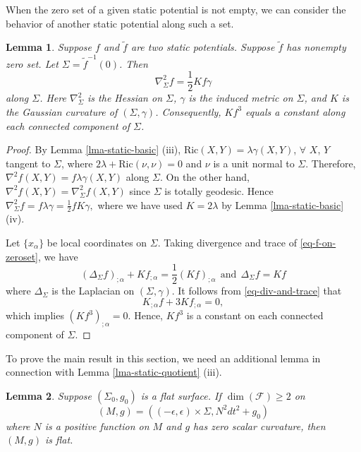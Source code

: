 \documentclass[12pt]{amsart}
\newtheorem{lma}{Lemma}[section]
\theoremstyle{remark}
\numberwithin{equation}{section}
\newcommand{\Ric}{\mbox{Ric}}
\newcommand{\be}{\begin{equation}}
\newcommand{\ee}{\end{equation}}
\newcommand{\bee}{\begin{equation*}}
\newcommand{\eee}{\end{equation*}}
\def\tf{\tilde{f}}
\def\K{\mathcal{F}}
\def\l{\lambda}
\def\tf{\tilde{f}}
\begin{document}
When the zero set of a given static potential is not empty, we can
 consider the behavior of another static potential along such a set.


\begin{lma} \label{lma-eq-on-zero}
Suppose $ f $ and $  \tf $ are two static potentials.
Suppose $\tf $ has nonempty zero set.
Let $ \Sigma = \tf^{-1}(0)$.
Then
\be \label{eq-f-on-zeroset}
 \nabla^2_\Sigma f  = \frac12 K f  \gamma
 \ee
along $ \Sigma$.  Here $ \nabla^2_\Sigma $ is the Hessian on $\Sigma$, $ \gamma $ is the induced metric on $ \Sigma$, and
 $K$  is the Gaussian curvature of $(\Sigma, \gamma)$.
 Consequently, $ K f^3$ equals a constant along each connected component of $ \Sigma$.


\end{lma}

\begin{proof}
By   Lemma \ref{lma-static-basic} (iii),
$ \Ric (X, Y) = \l  \gamma (X, Y)  $, $ \forall $
  $X$, $Y$ tangent to $ \Sigma$, where $ 2 \l +  \Ric(\nu, \nu) = 0$ and $ \nu $ is a unit normal to $ \Sigma$.
   Therefore,
 $ \nabla^2 f (X, Y) = f \l \gamma (X, Y) $ along  $ \Sigma$.
On the other hand,   $  \nabla^2 f (X, Y) =  \nabla^2_\Sigma  f (X, Y)$
since  $ \Sigma$ is totally geodesic.
Hence
$  \nabla^2_\Sigma  f  = f \l \gamma = \frac12 f K \gamma , $
where we have used $ K = 2 \l $ by  Lemma \ref{lma-static-basic} (iv).

 Let $\{ x_\alpha \}$ be local coordinates on $ \Sigma$.
 Taking divergence and trace of  \eqref{eq-f-on-zeroset},
 we have
\be \label{eq-div-and-trace}
(\Delta_\Sigma f )_{; \alpha} + K f_{; \alpha} = \frac12 ( K f  )_{;\alpha}  \ \ \mathrm{and} \ \ \Delta_\Sigma f  = K f
\ee
where $ \Delta_\Sigma$ is the Laplacian on $ (\Sigma, \gamma)$.
It follows from \eqref{eq-div-and-trace} that
\bee
K_{;\alpha} f + 3 K f _{; \alpha} = 0 ,
\eee
which implies
 $  ( K f^3)_{; \alpha} = 0 $.  Hence, $ K f^3 $ is a constant on each connected component of $ \Sigma$.
\end{proof}


To prove the main result in this section, we need an additional lemma in connection with Lemma \ref{lma-static-quotient} (iii).


\begin{lma} \label{lma-zero-curvature}
Suppose $(\Sigma_0 , g_0)$ is  a flat surface.
If $ \dim (\K)  \ge 2 $ on
$$(M, g) = ( ( - \epsilon, \epsilon) \times \Sigma, N^2 dt^2 + g_0 ) $$
where $N$ is a positive function on $M $  and $g$ has zero scalar curvature, then $(M, g)$ is flat.
\end{lma}
\end{document}
